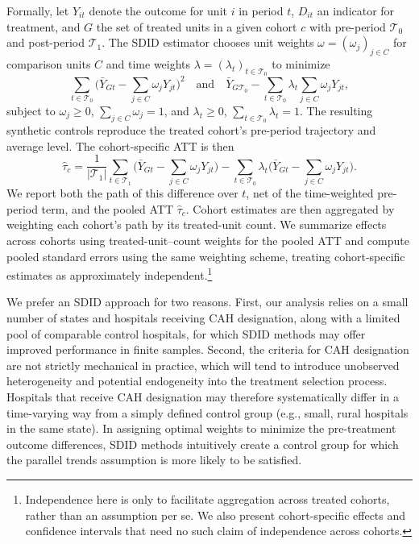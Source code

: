 \documentclass[a4paper, 12pt, twoside]{article}
\begin{document}
Formally, let $Y_{it}$ denote the outcome for unit $i$ in period $t$, $D_{it}$ an indicator for treatment, and $G$ the set of treated units in a given cohort $c$ with pre-period $\mathcal{T}_0$ and post-period $\mathcal{T}_1$. The SDID estimator chooses unit weights $\omega=(\omega_j)_{j\in C}$ for comparison units $C$ and time weights $\lambda=(\lambda_t)_{t\in\mathcal{T}_0}$ to minimize
\begin{equation*}
\sum_{t\in\mathcal{T}_0}\Big( \bar Y_{Gt} - \sum_{j\in C}\omega_j Y_{jt}\Big)^2 
\quad \text{and} \quad
\bar Y_{G\mathcal{T}_0} - \sum_{t\in \mathcal{T}_0}\lambda_t\sum_{j\in C}\omega_j Y_{jt},
\end{equation*}
subject to $\omega_j\ge 0$, $\sum_{j\in C}\omega_j=1$, and $\lambda_t\ge 0$, $\sum_{t\in \mathcal{T}_0}\lambda_t=1$. The resulting synthetic controls reproduce the treated cohort’s pre-period trajectory and average level. The cohort-specific ATT is then
\begin{equation*}
\widehat{\tau}_c = \frac{1}{|\mathcal{T}_1|}\sum_{t\in \mathcal{T}_1}\Big(\bar Y_{Gt} - \sum_{j\in C}\omega_j Y_{jt}\Big) - \sum_{t\in \mathcal{T}_0}\lambda_t\Big(\bar Y_{Gt} - \sum_{j\in C}\omega_j Y_{jt}\Big).
\end{equation*}
We report both the path of this difference over $t$, net of the time-weighted pre-period term, and the pooled ATT $\widehat\tau_c$. Cohort estimates are then aggregated by weighting each cohort’s path by its treated-unit count. We summarize effects across cohorts using treated-unit--count weights for the pooled ATT and compute pooled standard errors using the same weighting scheme, treating cohort-specific estimates as approximately independent.\footnote{Independence here is only to facilitate aggregation across treated cohorts, rather than an assumption per se. We also present cohort-specific effects and confidence intervals that need no such claim of independence across cohorts.}

We prefer an SDID approach for two reasons. First, our analysis relies on a small number of states and hospitals receiving CAH designation, along with a limited pool of comparable control hospitals, for which SDID methods may offer improved performance in finite samples. Second, the criteria for CAH designation are not strictly mechanical in practice, which will tend to introduce unobserved heterogeneity and potential endogeneity into the treatment selection process. Hospitals that receive CAH designation may therefore systematically differ in a time-varying way from a simply defined control group (e.g., small, rural hospitals in the same state). In assigning optimal weights to minimize the pre-treatment outcome differences, SDID methods intuitively create a control group for which the parallel trends assumption is more likely to be satisfied. 
\end{document}
